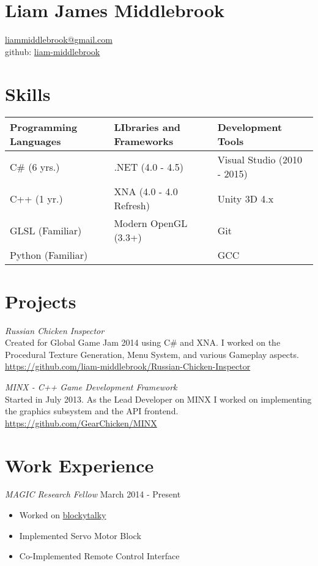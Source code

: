\documentclass[line,margin]{res}
\begin{document}
\marginsize{.25in}{.25in}{.25in}{.25in}

\section{Liam James Middlebrook}

\href{mailto:liammiddlebrook@gmail.com}{liammiddlebrook@gmail.com}\\
github: \href{https://github.com/liam-middlebrook}{liam-middlebrook}

\begin{resume}
\section{Skills}
\begin{table}[h]
\begin{tabular}{@{}lll@{}}
\toprule
Programming Languages & LIbraries and Frameworks & Development Tools           \\ \midrule
C\# (6 yrs.)          & .NET (4.0 - 4.5)         & Visual Studio (2010 - 2015) \\
C++ (1 yr.)           & XNA (4.0 - 4.0 Refresh)  & Unity 3D 4.x                \\
GLSL (Familiar)       & Modern OpenGL (3.3+)     & Git                         \\
Python (Familiar)     &                          & GCC                         \\ \bottomrule
\end{tabular}
\end{table}
\section{Projects}
{\sl Russian Chicken
Inspector}\\
Created for Global Game Jam 2014 using C\# and XNA. I worked on the Procedural
Texture Generation, Menu System, and various Gameplay aspects.\\
\url{https://github.com/liam-middlebrook/Russian-Chicken-Inspector}

{\sl MINX - C++ Game Development
Framework}\\
Started in July 2013. As the Lead Developer on MINX I worked on implementing
the graphics subsystem and the API frontend.\\
\url{https://github.com/GearChicken/MINX}


\section{Work Experience}
{\sl MAGIC Research Fellow} \hfill March 2014 - Present
\begin{itemize}
\itemsep1pt\parskip0pt
\item
  Worked on
  \href{https://github.com/liam-middlebrook/blockytalky.git}{blockytalky}
\item
  Implemented Servo Motor Block
\item
  Co-Implemented Remote Control Interface
\end{itemize}


\end{resume}
\end{document}
